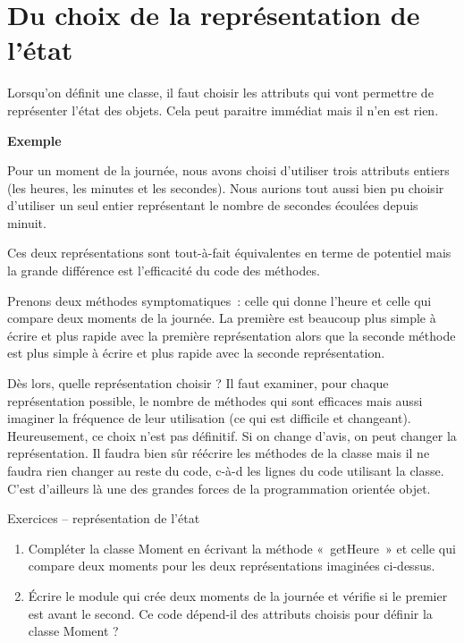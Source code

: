\section{Du choix de la représentation de l'état}

	Lorsqu'on définit une classe, il faut choisir les
	attributs qui vont permettre de représenter l'état des
	objets. Cela peut paraitre immédiat mais il n'en est
	rien.
	
	\textbf{Exemple}
		
	Pour un moment de la journée, nous avons choisi
	d'utiliser trois attributs entiers (les heures, les
	minutes et les secondes). Nous aurions tout aussi bien pu choisir
	d'utiliser un seul entier représentant le nombre de
	secondes écoulées depuis minuit.
	
	Ces deux représentations sont tout-à-fait équivalentes en terme de
	potentiel mais la grande différence est l'efficacité
	du code des méthodes. 
	
	Prenons deux méthodes symptomatiques~: celle qui donne
	l'heure et celle qui compare deux moments de la
	journée. La première est beaucoup plus simple à écrire et plus rapide
	avec la première représentation alors que la seconde méthode est plus
	simple à écrire et plus rapide avec la seconde représentation.
	
	Dès lors, quelle représentation choisir ? Il faut examiner, pour chaque
	représentation possible, le nombre de méthodes qui sont efficaces mais
	aussi imaginer la fréquence de leur utilisation (ce qui est difficile
	et changeant). Heureusement, ce choix n'est pas
	définitif. Si on change d'avis, on peut changer la
	représentation. Il faudra bien sûr réécrire les méthodes de la classe
	mais il ne faudra rien changer au reste du code, c-à-d les lignes du
	code utilisant la classe. C’est d’ailleurs là une des grandes forces de
	la programmation orientée objet.

	\begin{Emphase}{Exercices – représentation de l'état}
		\remonter
		\begin{enumerate}
			\item 
				Compléter la classe Moment en écrivant la méthode «~getHeure~» et celle
				qui compare deux moments pour les deux représentations imaginées
				ci-dessus.
			\item 
				Écrire le module qui crée deux moments de la journée et vérifie si le
				premier est avant le second. Ce code dépend-il des attributs choisis
				pour définir la classe Moment ?
		\end{enumerate}
	\end{Emphase}

